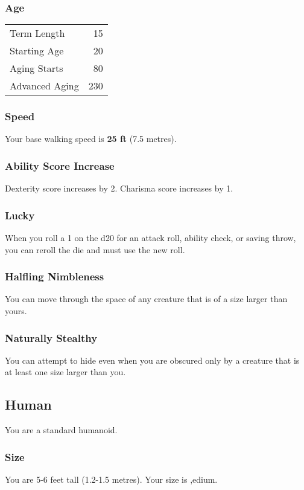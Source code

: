 \documentclass[10pt,twoside]{article}
\begin{document}
\begin{multicols}{2}
\subsubsection*{Age}
\begin{tabular}{ l r }
  Term Length & 15 \\
  Starting Age & 20 \\
  Aging Starts & 80 \\
  Advanced Aging & 230 \\
\end{tabular}

\subsubsection*{Speed}
Your base walking speed is \textbf{25 ft} (7.5 metres).

\subsubsection*{Ability Score Increase}
Dexterity score increases by 2.
Charisma score increases by 1.

\subsubsection*{Lucky}
When you roll a 1 on the d20 for an attack roll, ability check, or saving throw, you can reroll the die and must use the new roll.

\subsubsection*{Halfling Nimbleness}
You can move through the space of any creature that is of a size larger than yours.

\subsubsection*{Naturally Stealthy}
You can attempt to hide even when you are obscured only by a creature that is at least one size larger than you.


\subsection{Human}

You are a standard humanoid.

\subsubsection*{Size}
You are 5-6 feet tall (1.2-1.5 metres). Your size is ,edium.


\end{multicols}
\end{document}
